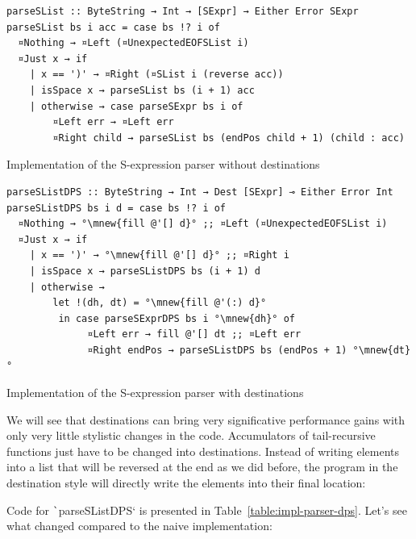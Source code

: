 \documentclass[english]{jflart}
\newcommand{\mnew}[1]{\colorbox{green!50}{#1}}
\begin{document}
\begin{table}[t]
\small
\begin{verbatim}
parseSList :: ByteString → Int → [SExpr] → Either Error SExpr
parseSList bs i acc = case bs !? i of
  ¤Nothing → ¤Left (¤UnexpectedEOFSList i)
  ¤Just x → if
    | x == ')' → ¤Right (¤SList i (reverse acc))
    | isSpace x → parseSList bs (i + 1) acc
    | otherwise → case parseSExpr bs i of
        ¤Left err → ¤Left err
        ¤Right child → parseSList bs (endPos child + 1) (child : acc)
\end{verbatim}
\caption{Implementation of the S-expression parser without destinations}
\label{table:impl-parser-naive}

\bigskip

\small
\begin{verbatim}
parseSListDPS :: ByteString → Int → Dest [SExpr] ⊸ Either Error Int
parseSListDPS bs i d = case bs !? i of
  ¤Nothing → °\mnew{fill @'[] d}° ;; ¤Left (¤UnexpectedEOFSList i)
  ¤Just x → if
    | x == ')' → °\mnew{fill @'[] d}° ;; ¤Right i
    | isSpace x → parseSListDPS bs (i + 1) d
    | otherwise →
        let !(dh, dt) = °\mnew{fill @'(:) d}°
         in case parseSExprDPS bs i °\mnew{dh}° of
              ¤Left err → fill @'[] dt ;; ¤Left err
              ¤Right endPos → parseSListDPS bs (endPos + 1) °\mnew{dt}°
\end{verbatim}
\caption{Implementation of the S-expression parser with destinations}
\label{table:impl-parser-dps}
\end{table}

We will see that destinations can bring very significative performance gains with only very little stylistic changes in the code. Accumulators of tail-recursive functions just have to be changed into destinations. Instead of writing elements into a list that will be reversed at the end as we did before, the program in the destination style will directly write the elements into their final location:

Code for \texttt`parseSListDPS` is presented in Table~\ref{table:impl-parser-dps}. Let's see what changed compared to the naive implementation:
\end{document}
